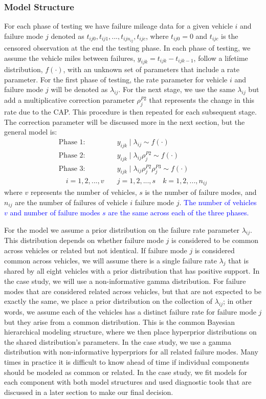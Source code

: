 \documentclass[12pt]{article}
\begin{document}
\subsubsection{Model Structure}
For each phase of testing we have failure mileage data for
a given vehicle $i$ and failure mode $j$ denoted as $t_{ij0}, t_{ij1},...,
t_{ijn_{ij}}, t_{ijc}$, where $t_{ij0} = 0$ and $t_{ijc}$ is the censored
observation at the end the testing phase. In each phase of testing, we assume
the vehicle miles between failures, $y_{ijk} = t_{ijk} - t_{ijk-1}$, follow a
lifetime distribution, $f(\cdot)$, with an unknown set of parameters that include
a rate parameter.  For the first phase of testing, the rate parameter for vehicle $i$ and
failure mode $j$ will be denoted as $\lambda_{ij}$.  For the next stage, we use the same $\lambda_{ij}$ but add a multiplicative correction parameter
$\rho_{j}^{P2}$ that represents the change in this rate due to the CAP.  This
procedure is then repeated for each subsequent stage.  The correction parameter
will be discussed more in the next section, but the general model is:
\begin{align*}
\text{Phase 1: }&y_{ijk}\mid\lambda_{ij}\sim f(\cdot) \\
\text{Phase 2: }&y_{ijk}\mid\lambda_{ij}\rho_{j}^{P2}\sim f(\cdot) \\
\text{Phase 3: }&y_{ijk}\mid\lambda_{ij}\rho_{j}^{P2}\rho_{j}^{P3}\sim f(\cdot) \\
\quad i = 1,2,...,v \quad &j=1,2,...,s \quad k=1,2,...,n_{ij}
\end{align*}
where $v$ represents the number of vehicles, $s$ is the number of failure modes,
and $n_{ij}$ are the number of failures of vehicle $i$ failure mode $j$.  \textcolor{blue}{The number of vehicles $v$ and number of failure modes $s$ are the same across each of the three phases.}

For the model we assume a prior distribution on the failure rate parameter
$\lambda_{ij}$.  This distribution depends on whether failure mode $j$ is
considered to be common across vehicles or related but not identical.  If
failure mode $j$ is considered common across vehicles, we will assume there is a
single failure rate $\lambda_j$ that is shared by all eight vehicles with a
prior distribution that has positive support.  In the case study, we will use a
non-informative gamma distribution.  For failure modes that are considered
related across vehicles, but that are not expected to be exactly the same, we place a
prior distribution on the collection of $\lambda_{ij}$; in other words, we
assume each of the vehicles has a distinct failure rate for failure mode $j$ but
they arise from a common distribution.  This is the common Bayesian hierarchical
modeling structure, where we then place  hyperprior distributions on the shared
distribution's parameters.  In the case study, we use a gamma distribution with
non-informative hyperpriors for all related failure modes.  Many times in
practice  it is difficult to know ahead of time if individual components should
be modeled  as common or related.  In the case study, we fit models for each
component with both model structures and used diagnostic tools  that are
discussed in a later section to make our final decision.
\end{document}
